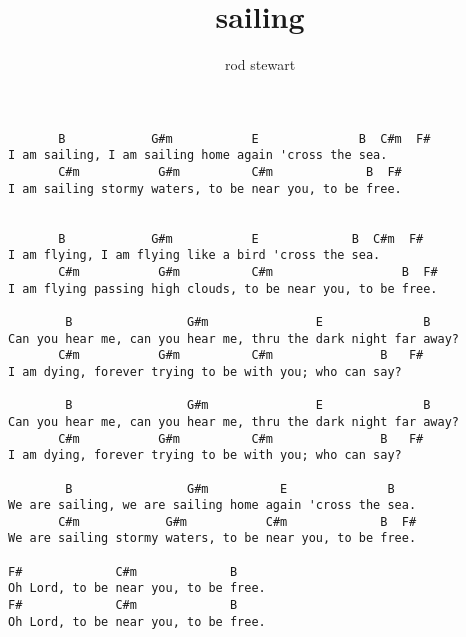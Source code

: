 \author{rod stewart}
\title{sailing}
\maketitle
\begin{verbatim}
       B            G#m           E              B  C#m  F#     
I am sailing, I am sailing home again 'cross the sea.
       C#m           G#m          C#m             B  F#
I am sailing stormy waters, to be near you, to be free.  


       B            G#m           E             B  C#m  F#     
I am flying, I am flying like a bird 'cross the sea.
       C#m           G#m          C#m                  B  F#
I am flying passing high clouds, to be near you, to be free.

        B                G#m               E              B     
Can you hear me, can you hear me, thru the dark night far away?
       C#m           G#m          C#m               B   F#
I am dying, forever trying to be with you; who can say?

        B                G#m               E              B     
Can you hear me, can you hear me, thru the dark night far away?
       C#m           G#m          C#m               B   F#
I am dying, forever trying to be with you; who can say?

        B                G#m          E              B     
We are sailing, we are sailing home again 'cross the sea.
       C#m            G#m           C#m             B  F#
We are sailing stormy waters, to be near you, to be free.

F#             C#m             B
Oh Lord, to be near you, to be free.
F#             C#m             B
Oh Lord, to be near you, to be free.
\end{verbatim}
